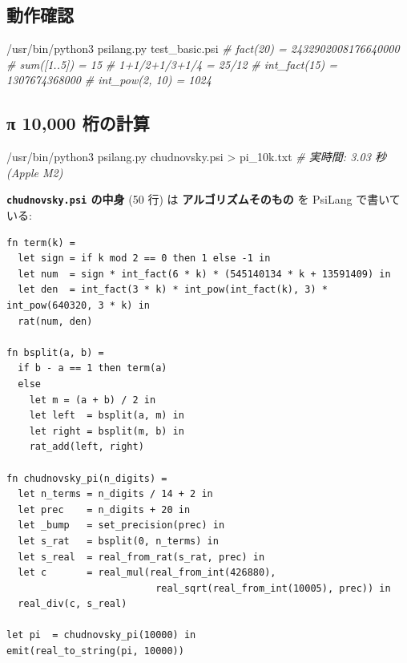 \documentclass[
]{ltjsarticle}
\newenvironment{Shaded}{}{}
\newcommand{\CommentTok}[1]{\textcolor[rgb]{0.38,0.63,0.69}{\textit{#1}}}
\newcommand{\ExtensionTok}[1]{#1}
\newcommand{\NormalTok}[1]{#1}
\newcommand{\OperatorTok}[1]{\textcolor[rgb]{0.40,0.40,0.40}{#1}}
\begin{document}
\subsection{動作確認}\label{ux52d5ux4f5cux78baux8a8d}

\begin{Shaded}
\begin{Highlighting}[]
\ExtensionTok{/usr/bin/python3}\NormalTok{ psilang.py test\_basic.psi}
\CommentTok{\# fact(20) = 2432902008176640000}
\CommentTok{\# sum([1..5]) = 15}
\CommentTok{\# 1+1/2+1/3+1/4 = 25/12}
\CommentTok{\# int\_fact(15) = 1307674368000}
\CommentTok{\# int\_pow(2, 10) = 1024}
\end{Highlighting}
\end{Shaded}

\subsection{π 10,000
桁の計算}\label{ux3c0-10000-ux6841ux306eux8a08ux7b97}

\begin{Shaded}
\begin{Highlighting}[]
\ExtensionTok{/usr/bin/python3}\NormalTok{ psilang.py chudnovsky.psi }\OperatorTok{\textgreater{}}\NormalTok{ pi\_10k.txt}
\CommentTok{\# 実時間: 3.03 秒 (Apple M2)}
\end{Highlighting}
\end{Shaded}

\textbf{\texttt{chudnovsky.psi} の中身} (50 行) は
\textbf{アルゴリズムそのもの} を PsiLang で書いている:

\begin{verbatim}
fn term(k) =
  let sign = if k mod 2 == 0 then 1 else -1 in
  let num  = sign * int_fact(6 * k) * (545140134 * k + 13591409) in
  let den  = int_fact(3 * k) * int_pow(int_fact(k), 3) * int_pow(640320, 3 * k) in
  rat(num, den)

fn bsplit(a, b) =
  if b - a == 1 then term(a)
  else
    let m = (a + b) / 2 in
    let left  = bsplit(a, m) in
    let right = bsplit(m, b) in
    rat_add(left, right)

fn chudnovsky_pi(n_digits) =
  let n_terms = n_digits / 14 + 2 in
  let prec    = n_digits + 20 in
  let _bump   = set_precision(prec) in
  let s_rat   = bsplit(0, n_terms) in
  let s_real  = real_from_rat(s_rat, prec) in
  let c       = real_mul(real_from_int(426880),
                          real_sqrt(real_from_int(10005), prec)) in
  real_div(c, s_real)

let pi  = chudnovsky_pi(10000) in
emit(real_to_string(pi, 10000))
\end{verbatim}
\end{document}
